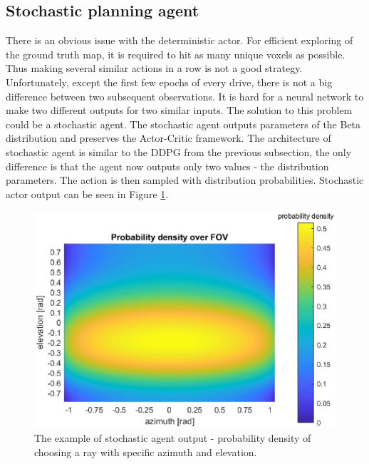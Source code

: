 \subsection{Stochastic planning agent}
There is an obvious issue with the deterministic actor. For efficient exploring of the ground truth map, it is required to hit as many unique voxels as possible. Thus making several similar actions in a row is not a good strategy. Unfortunately, except the first few epochs of every drive, there is not a big difference between two subsequent observations. It is hard for a neural network to make two different outputs for two similar inputs. The solution to this problem could be a stochastic agent. The stochastic agent outputs parameters of the Beta distribution and preserves the Actor-Critic framework. The architecture of stochastic agent is similar to the DDPG from the previous subsection, the only difference is that the agent now outputs only two values - the distribution parameters. The action is then sampled with distribution probabilities. Stochastic actor output can be seen in Figure \ref{fig:stochaction}.

\clearpage

\begin{figure}[H]
\centering
\includegraphics[width=0.85\linewidth]{fig/betapdf.eps}
\caption[Example of stochastic actor output]{The example of stochastic agent output - probability density of choosing a ray with specific azimuth and elevation.}
\label{fig:stochaction}
\end{figure}

